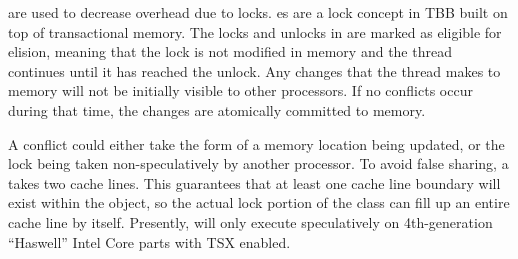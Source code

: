 
 are used to decrease overhead due to locks.
es are a lock concept in TBB
built on top of transactional memory. The locks and unlocks in
 are marked as eligible for elision, meaning that
the lock is not modified in memory and the thread continues until it has
reached the unlock. Any changes that the thread makes to memory will not be
initially visible to other processors. If no conflicts occur during that time,
the changes are atomically committed to memory.

A conflict could either take the form of a memory location being updated, or
the lock being taken non-speculatively by another processor. To avoid false
sharing, a  takes two cache lines. This
guarantees that at least one cache line boundary will exist within the object,
so the actual lock portion of the class can fill up an entire cache line by
itself. Presently,  will only execute
speculatively on 4th-generation ``Haswell'' Intel Core parts with TSX enabled.
